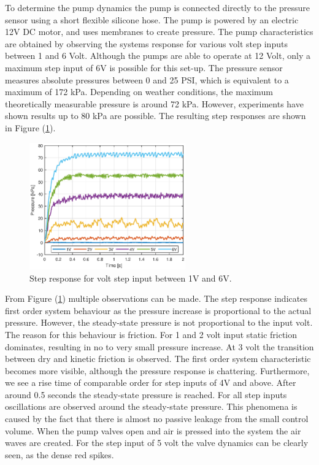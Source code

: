 To determine the pump dynamics the pump is connected directly to the pressure sensor using a short flexible silicone hose. The pump is powered by an electric 12V DC motor, and uses membranes to create pressure. The pump characteristics are obtained by observing the systems response for various volt step inputs between 1 and 6 Volt. Although the pumps are able to operate at 12 Volt, only a maximum step input of 6V is possible for this set-up. The pressure sensor measures absolute pressures between 0 and 25 PSI, which is equivalent to a maximum of 172 kPa. Depending on weather conditions, the maximum theoretically measurable pressure is around 72 kPa. However, experiments have shown results up to 80 kPa are possible. The resulting step responses are shown in Figure (\ref{fig1:pump_dynamcis}).

\begin{figure}[H]
    \centering
    \includegraphics[width = 0.6\textwidth]{Figures/Chapter3/stepresponsdirect16V.eps}
    \caption{Step response for volt step input between 1V and 6V.}
    \label{fig1:pump_dynamcis}
\end{figure}

From Figure (\ref{fig1:pump_dynamcis}) multiple observations can be made. The step response indicates first order system behaviour as the pressure increase is proportional to the actual pressure. However, the steady-state pressure is not proportional to the input volt. The reason for this behaviour is friction. For 1 and 2 volt input static friction dominates, resulting in no to very small pressure increase.
At 3 volt the transition between dry and kinetic friction is observed. The first order system characteristic becomes more visible, although the pressure response is chattering. Furthermore, we see a rise time of comparable order for step inputs of 4V and above. After around 0.5 seconds the steady-state pressure is reached. For all step inputs oscillations are observed around the steady-state pressure. This phenomena is caused by the fact that there is almost no passive leakage from the small control volume. When the pump valves open and air is pressed into the system the air waves are created. For the step input of 5 volt the valve dynamics can be clearly seen, as the dense red spikes.

